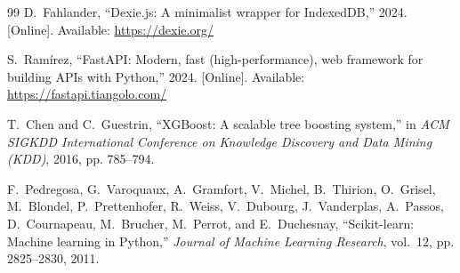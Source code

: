 \documentclass[12pt,a4paper]{report}
\begin{document}
\begin{thebibliography}{99}
D.~Fahlander, ``Dexie.js: A minimalist wrapper for IndexedDB,'' 2024. [Online]. Available: \url{https://dexie.org/}

S.~Ram\'irez, ``FastAPI: Modern, fast (high-performance), web framework for building APIs with Python,'' 2024. [Online]. Available: \url{https://fastapi.tiangolo.com/}

T.~Chen and C.~Guestrin, ``XGBoost: A scalable tree boosting system,'' in \emph{ACM SIGKDD International Conference on Knowledge Discovery and Data Mining (KDD)}, 2016, pp. 785--794.

F.~Pedregosa, G.~Varoquaux, A.~Gramfort, V.~Michel, B.~Thirion, O.~Grisel, M.~Blondel, P.~Prettenhofer, R.~Weiss, V.~Dubourg, J.~Vanderplas, A.~Passos, D.~Cournapeau, M.~Brucher, M.~Perrot, and E.~Duchesnay, ``Scikit-learn: Machine learning in Python,'' \emph{Journal of Machine Learning Research}, vol.~12, pp. 2825--2830, 2011.

\end{thebibliography}
\end{document}
